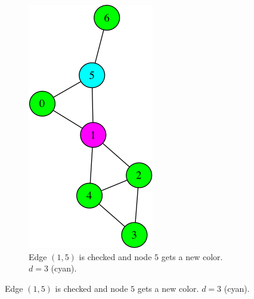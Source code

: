 \begin{figure}
\begin{subfigure}{0.20\textwidth}
\end{subfigure}
\hspace*{\fill} %
\begin{subfigure}{0.20\textwidth}
\includegraphics[width=\linewidth]{images/coloring/3.png}
\caption{Edge $(1,5)$ is checked and node $5$ gets a new color. $d=3$ (cyan).} \label{fig:coloring3}
\end{subfigure}


\end{figure}
